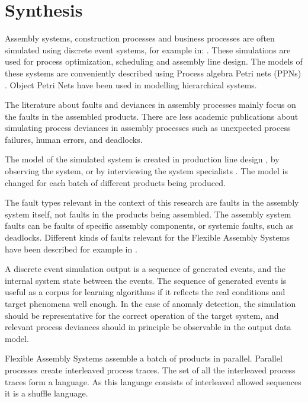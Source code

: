 \documentclass[a4paper,10pt]{article}
\begin{document}
\section{Synthesis}

Assembly systems, construction processes and business processes are often simulated using discrete event systems, for example in:
\cite{hlupic1998business,zhao2010efficient,kang2013active,rahnama2010fuzzy}. These simulations are used for process optimization\cite{sadeghi2008framework}, scheduling and
assembly line design. The models of these systems are conveniently described using Process algebra Petri nets (PPNs) \cite{falkman2007specification}. Object Petri Nets
have been used in modelling hierarchical systems\cite{wu2015method}.

The literature about faults and deviances in assembly processes mainly focus on the faults in the assembled products.
There are less academic publications about simulating process deviances in assembly processes such as unexpected process failures, human errors, and deadlocks.

The model of the simulated system is created in production line design \cite{bullinger}, by observing the system, or by interviewing the system specialists \cite{montevechi2012using}.
The model is changed for each batch of different products being produced.

The fault types relevant in the context of this research are faults in the assembly system itself, not faults in the products being assembled.
The assembly system faults can be faults of specific assembly components, or systemic faults, such as deadlocks.
Different kinds of faults relevant for the Flexible Assembly Systems have been described for example in \cite{cong1997fault}.

A discrete event simulation output is a sequence of generated events,
and the internal system state between the events. The sequence of generated events is useful as a corpus for learning algorithms if it reflects the real conditions and
target phenomena well enough. In the case of anomaly detection, the simulation should be representative for the correct operation of the target system, and relevant process deviances
should in principle be observable in the output data model.

Flexible Assembly Systems assemble a batch of products in parallel.
Parallel processes create interleaved process traces. The set of all the interleaved process traces form a language. As this language consists of interleaved allowed sequences
it is a shuffle language\cite{berglund2011recognizing}.
\end{document}
